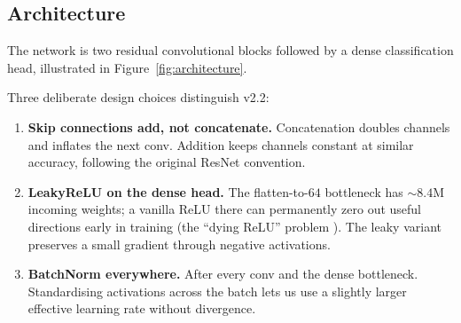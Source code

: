 \documentclass[anonymous, manuscript, screen, review]{acmart}
\begin{document}
\subsection{Architecture}

The network is two residual convolutional blocks followed by a dense
classification head, illustrated in Figure~\ref{fig:architecture}.

Three deliberate design choices distinguish v2.2:

\begin{enumerate}[leftmargin=*,topsep=2pt,itemsep=1pt]
\item \textbf{Skip connections add, not concatenate.} Concatenation
   doubles channels and inflates the next conv. Addition keeps channels
   constant at similar accuracy, following the original
   ResNet \cite{he2016resnet} convention.
\item \textbf{LeakyReLU on the dense head.} The flatten-to-$64$
   bottleneck has $\sim$$8.4$M incoming weights; a vanilla ReLU there
   can permanently zero out useful directions early in training (the
   ``dying ReLU'' problem \cite{maas2013leaky}). The leaky variant
   preserves a small gradient through negative activations.
\item \textbf{BatchNorm everywhere.} After every conv and the dense
   bottleneck. Standardising activations across the batch lets us use
   a slightly larger effective learning rate without divergence.
\end{enumerate}
\end{document}
